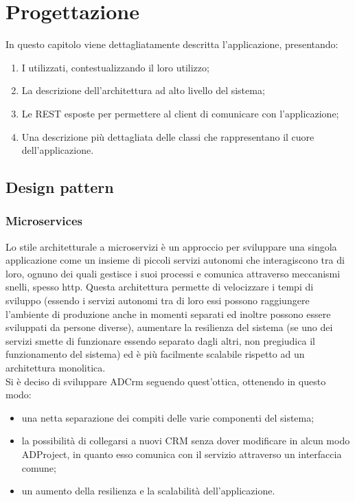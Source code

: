 \documentclass[12pt,a4paper,twoside,openright,english]{book}
\begin{document}
\chapter{Progettazione}\label{progettazione}
In questo capitolo viene dettagliatamente descritta l'applicazione, presentando: 
\begin{enumerate}
	\itemsep-1em 
	\item I  utilizzati, contestualizzando il loro utilizzo;
	\item La descrizione dell'architettura ad alto livello del sistema;
	\item Le  REST esposte per permettere al client di comunicare con l'applicazione;
	\item Una descrizione più dettagliata delle classi che rappresentano il cuore dell'applicazione.
\end{enumerate}

\section{Design pattern}\label{design_pattern}
\subsection{Microservices}
Lo stile architetturale a microservizi è un approccio per sviluppare una singola applicazione come un insieme di piccoli servizi autonomi che interagiscono tra di loro, ognuno dei quali gestisce i suoi processi e comunica attraverso meccanismi snelli, spesso  http.
Questa architettura permette di velocizzare i tempi di sviluppo (essendo i servizi autonomi tra di loro essi possono raggiungere l'ambiente di produzione anche in momenti separati ed inoltre possono essere sviluppati da persone diverse), aumentare la resilienza del sistema (se uno dei servizi smette di funzionare essendo separato dagli altri, non pregiudica il funzionamento del sistema) ed è più facilmente scalabile rispetto ad un architettura monolitica.\\
Si è deciso di sviluppare ADCrm seguendo quest'ottica, ottenendo in questo modo:
\begin{itemize}
	\itemsep-1em 
	\item una netta separazione dei compiti delle varie componenti del sistema;
	\item la possibilità di collegarsi a nuovi CRM senza dover modificare in alcun modo ADProject, in quanto esso comunica con il servizio attraverso un interfaccia comune;
	\item un aumento  della resilienza e la scalabilità dell'applicazione.
\end{itemize}
\end{document}
